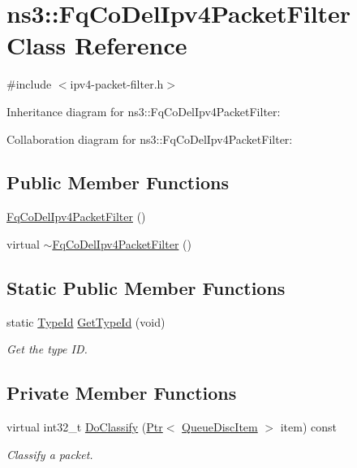 \hypertarget{classns3_1_1FqCoDelIpv4PacketFilter}{}\section{ns3\+:\+:Fq\+Co\+Del\+Ipv4\+Packet\+Filter Class Reference}
\label{classns3_1_1FqCoDelIpv4PacketFilter}


{\ttfamily \#include $<$ipv4-\/packet-\/filter.\+h$>$}



Inheritance diagram for ns3\+:\+:Fq\+Co\+Del\+Ipv4\+Packet\+Filter\+:


Collaboration diagram for ns3\+:\+:Fq\+Co\+Del\+Ipv4\+Packet\+Filter\+:
\subsection*{Public Member Functions}
\begin{DoxyCompactItemize}
\item 
\hyperlink{classns3_1_1FqCoDelIpv4PacketFilter_a243719198c32c9d009ef760d73f086ad}{Fq\+Co\+Del\+Ipv4\+Packet\+Filter} ()
\item 
virtual \hyperlink{classns3_1_1FqCoDelIpv4PacketFilter_a9d68ada2059fcd12053de1549aa10f8d}{$\sim$\+Fq\+Co\+Del\+Ipv4\+Packet\+Filter} ()
\end{DoxyCompactItemize}
\subsection*{Static Public Member Functions}
\begin{DoxyCompactItemize}
\item 
static \hyperlink{classns3_1_1TypeId}{Type\+Id} \hyperlink{classns3_1_1FqCoDelIpv4PacketFilter_a4e1209791db9c9ec2432056f3bb41a1d}{Get\+Type\+Id} (void)
\begin{DoxyCompactList}\small\item\em Get the type ID. \end{DoxyCompactList}\end{DoxyCompactItemize}
\subsection*{Private Member Functions}
\begin{DoxyCompactItemize}
\item 
virtual int32\+\_\+t \hyperlink{classns3_1_1FqCoDelIpv4PacketFilter_a30e9d58fd5f789f3117e8c56676f04b8}{Do\+Classify} (\hyperlink{classns3_1_1Ptr}{Ptr}$<$ \hyperlink{classns3_1_1QueueDiscItem}{Queue\+Disc\+Item} $>$ item) const 
\begin{DoxyCompactList}\small\item\em Classify a packet. \end{DoxyCompactList}\end{DoxyCompactItemize}
